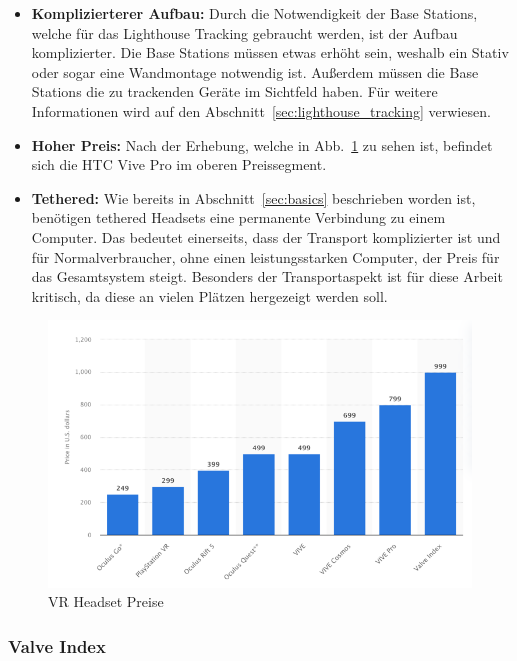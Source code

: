 \begin{itemize}
    \item \textbf{Komplizierterer Aufbau:} Durch die Notwendigkeit der Base Stations, welche für das Lighthouse Tracking gebraucht werden, ist der Aufbau komplizierter.
    Die Base Stations müssen etwas erhöht sein, weshalb ein Stativ oder sogar eine Wandmontage notwendig ist.
    Außerdem müssen die Base Stations die zu trackenden Geräte im Sichtfeld haben.
    Für weitere Informationen wird auf den Abschnitt~\ref{sec:lighthouse_tracking} verwiesen.
    \item \textbf{Hoher Preis:} Nach der Erhebung, welche in Abb.~\ref{fig:vr_headset_prices} zu sehen ist, befindet sich die HTC Vive Pro im oberen Preissegment.
    \item \textbf{Tethered:} Wie bereits in Abschnitt~\ref{sec:basics} beschrieben worden ist, benötigen tethered Headsets eine permanente Verbindung zu einem Computer.
    Das bedeutet einerseits, dass der Transport komplizierter ist und für Normalverbraucher, ohne einen leistungsstarken Computer, der Preis für das Gesamtsystem steigt.
    Besonders der Transportaspekt ist für diese Arbeit kritisch, da diese an vielen Plätzen hergezeigt werden soll.
\end{itemize}

\begin{figure}
    \centering
    \includegraphics[scale=0.5]{pics/vr_headset_price_statistic}
    \caption{VR Headset Preise~\cite{ALSOP_2019}}
    \label{fig:vr_headset_prices}
\end{figure}

\subsubsection{Valve Index}

